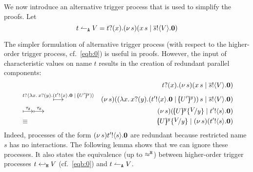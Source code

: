 We now introduce an alternative trigger process
that is used to simplify the proofs. Let
\begin{equation}
	t \leftharpoonup_\mathtt{A} V = t ? (x) . (\nu\, s)(x\, {s} \;|\; \overline{s} ! \langle V \rangle . \mathbf{0})
	\label{eq:ntrig}
\end{equation}

The simpler formulation of alternative trigger process (with respect to the higher-order trigger process, cf.~\eqref{eqb:0}) 
is useful in proofs.
However, the input of characteristic values on name $t$
results in the creation of redundant parallel components:
\begin{eqnarray*}
	&&\newtrigger{t}{V}\\
	&\hby{\bactinp{t}{ \abs{x}{\binp{x}{y} (\bout{t'}{x} \inact \Par \mapchar{U'}{y} )  }} }&
	\newsp{s}{\appl{(\abs{x}{\binp{x}{y} (\bout{t'}{x} \inact \Par \mapchar{U'}{y} ))}}{s} \Par \bout{\dual{s}}{V} \inact}\\
	&\hby{\dtau}\hby{\dtau}
	&\newsp{s}{\mapchar{U}{y} \subst{V}{y} \Par \bout{t'}{s} \inact } \\
	&\scong&
	\mapchar{U}{y} \subst{V}{y} \Par \newsp{s}{\bout{t'}{s} \inact}
\end{eqnarray*}
Indeed, processes 
of the form $(\nu\, s){t' ! \langle s \rangle . \mathbf{0}}$ 
are redundant because restricted name $s$ has no interactions.
The following  
lemma shows that we can ignore these processes. 
It also states the equivalence (up to $\approx^\mathtt{H}$) between
higher-order trigger processes $t \hookleftarrow_{\mathtt{H}} V$ (cf.~\eqref{eqb:0}) and $t \leftharpoonup_\mathtt{A} V$.
